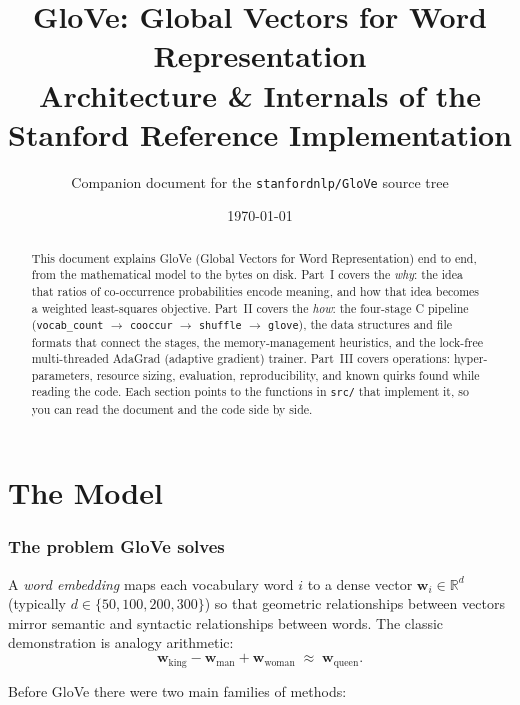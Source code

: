\documentclass[11pt,a4paper]{article}
\title{\textbf{GloVe: Global Vectors for Word Representation}\\[4pt]
  \large Architecture \& Internals of the Stanford Reference Implementation}
\author{Companion document for the \texttt{stanfordnlp/GloVe} source tree}
\date{\today}
\newcommand{\file}[1]{\texttt{#1}}
\newcommand{\R}{\mathbb{R}}
\newcommand{\wv}{\mathbf{w}}
\begin{document}
\maketitle

\begin{abstract}
\noindent
This document explains GloVe (Global Vectors for Word Representation) end to end, from the mathematical model to the bytes on disk.
Part~I covers the \emph{why}: the idea that ratios of co-occurrence probabilities encode
meaning, and how that idea becomes a weighted least-squares objective. Part~II covers the
\emph{how}: the four-stage C pipeline (\texttt{vocab\_count} $\rightarrow$ \texttt{cooccur}
$\rightarrow$ \texttt{shuffle} $\rightarrow$ \texttt{glove}), the data structures and file
formats that connect the stages, the memory-management heuristics, and the lock-free
multi-threaded AdaGrad (adaptive gradient) trainer. Part~III covers operations: hyper-parameters, resource
sizing, evaluation, reproducibility, and known quirks found while reading the code.
Each section points to the functions in \file{src/} that implement it, so you can read the
document and the code side by side.
\end{abstract}

\tableofcontents
\newpage

\part{The Model}

\section{The problem GloVe solves}

A \emph{word embedding} maps each vocabulary word $i$ to a dense vector $\wv_i\in\R^d$
(typically $d\in\{50,100,200,300\}$) so that geometric relationships between vectors
mirror semantic and syntactic relationships between words. The classic demonstration is
analogy arithmetic:
\[
  \wv_{\text{king}} - \wv_{\text{man}} + \wv_{\text{woman}} \;\approx\; \wv_{\text{queen}}.
\]

Before GloVe there were two main families of methods:
\end{document}
